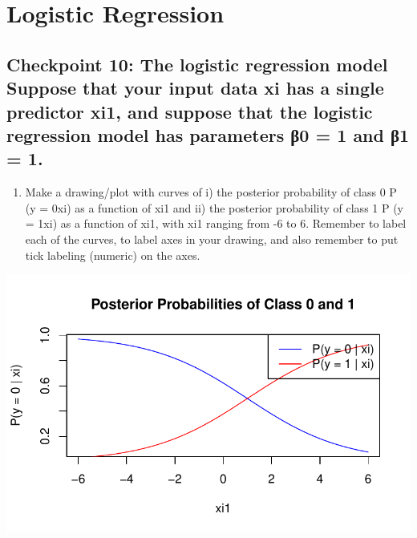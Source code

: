 \documentclass[
  letterpaper,
  DIV=11,
  numbers=noendperiod]{scrartcl}
\providecommand{\tightlist}{%
  \setlength{\itemsep}{0pt}\setlength{\parskip}{0pt}}\usepackage{longtable,booktabs,array}
\begin{document}
\hypertarget{logistic-regression}{%
\section{Logistic Regression}\label{logistic-regression}}

\hypertarget{checkpoint-10-the-logistic-regression-model-suppose-that-your-input-data-xi-has-a-single-predictor-xi1-and-suppose-that-the-logistic-regression-model-has-parameters-ux3b20-1-and-ux3b21-1.}{%
\subsection{Checkpoint 10: The logistic regression model Suppose that
your input data xi has a single predictor xi1, and suppose that the
logistic regression model has parameters β0 = 1 and β1 =
1.}\label{checkpoint-10-the-logistic-regression-model-suppose-that-your-input-data-xi-has-a-single-predictor-xi1-and-suppose-that-the-logistic-regression-model-has-parameters-ux3b20-1-and-ux3b21-1.}}

\begin{enumerate}
\def\labelenumi{(\alph{enumi})}
\tightlist
\item
  Make a drawing/plot with curves of i) the posterior probability of
  class 0 P (y = 0\textbar xi) as a function of xi1 and ii) the
  posterior probability of class 1 P (y = 1\textbar xi) as a function of
  xi1, with xi1 ranging from -6 to 6. Remember to label each of the
  curves, to label axes in your drawing, and also remember to put tick
  labeling (numeric) on the axes.
\end{enumerate}

\includegraphics{excercise_doc_files/figure-pdf/unnamed-chunk-6-1.pdf}
\end{document}
